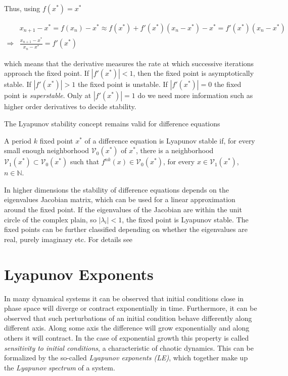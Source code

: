 Thus, using $f(x^{\ast}) = x^{\ast}$

\begin{align}
    &x_{n+1} - x^{\ast} = f(x_n) - x^{\ast} \approx f(x^{\ast}) + f'(x^{\ast})(x_n - x^{\ast}) - x^{\ast} = f'(x^{\ast})(x_n - x^{\ast}) \nonumber\\ 
    \Rightarrow &\frac{x_{n+1} - x^{\ast}}{x_n - x^{\ast}} = f'(x^{\ast}) 
\end{align}

which means that the derivative measures the rate at which successive iterations approach the fixed point. 
If $|f'(x^{\ast})| < 1$, then the fixed point is asymptotically stable. If $|f'(x^{\ast})| > 1$ the fixed point is unstable. If $|f'(x^{\ast})| = 0$
the fixed point is \textit{superstable}. Only at $|f'(x^{\ast})| = 1$ do we need more information such as higher order derivatives to decide stability.



The Lyapunov stability concept remains valid for difference equations

\begin{definition}
    A period $k$ fixed point $x^{\ast}$ of a difference equation is Lyapunov stable if, for every small enough neighborhood $\mathcal{V}_0(x^{\ast})$ of $x^{\ast}$, 
    there is a neighborhood $\mathcal{V}_1(x^{\ast}) \subset \mathcal{V}_0(x^{\ast})$ such that $f^{nk}(x)\in \mathcal{V}_0(x^{\ast})$, for every 
    $x \in \mathcal{V}_1(x^{\ast})$, $n\in\mathbb{N}$. 
\end{definition}

In higher dimensions the stability of difference equations depends on the eigenvalues Jacobian matrix, which can be used for a linear approximation around the fixed point.
If the eigenvalues of the Jacobian are within the unit circle of the complex plain, so $|\lambda_i| < 1$, the fixed point is Lyapunov stable. The fixed points can be 
further classified depending on whether the eigenvalues are real, purely imaginary etc. For details see \cite[Ch 1.4, Appendix A.3]{dilao2023dynamical}

\section{Lyapunov Exponents} \label{sec:lya_exp}

In many dynamical systems it can be observed that initial conditions close in phase space will diverge or contract exponentially in time. Furthermore, it can be observed that 
such perturbations of an initial condition behave differently along different axis. Along some axis the difference will grow exponentially and along others it will contract.
In the case of exponential growth this property is called \textit{sensitivity to initial conditions}, a characteristic of chaotic dynamics. This can be formalized by the 
so-called \textit{Lyapunov exponents (LE)}, which together make up the \textit{Lyapunov spectrum} of a system.

